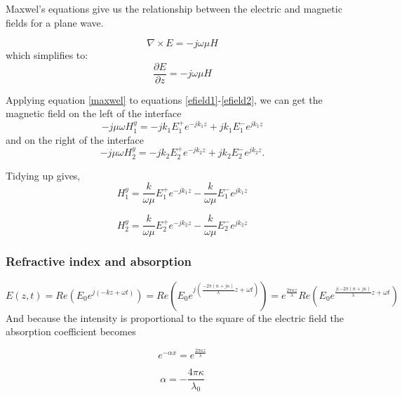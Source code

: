 \documentclass[11pt]{article}
\begin{document}
Maxwel's equations give us the relationship between the electric and magnetic fields for a plane wave.

\begin{equation}
\nabla \times E=-j\omega \mu H 
\end{equation}
which simplifies to:
\begin{equation}
\frac{\partial E} {\partial z}=-j\omega \mu H 
\label{maxwel}
\end{equation}

Applying equation \ref{maxwel} to equations \ref{efield1}-\ref{efield2}, we can get the magnetic field on the left of the interface
\begin{equation}
-j \mu \omega H^{y}_{1}=-j k_1 E^{+}_{1} e^{-j k_1 z}+j k_1 E^{-}_{1} e^{j k_1 z}
\end{equation}
and on the right of the interface
\begin{equation}
-j \mu \omega H^{y}_{2}=-j k_2 E^{+}_{2} e^{-j k_2 z}+j k_2 E^{-}_{2} e^{j k_2 z}.
\end{equation}

Tidying up gives,
\begin{equation}
H^{y}_{1}=\frac{k}{\omega \mu}E^{+}_{1} e^{-j k_1 z}-\frac{k}{\omega \mu} E^{-}_{1} e^{j k_1 z}
\end{equation}

\begin{equation}
H^{y}_{2}=\frac{k}{\omega \mu}E^{+}_{2} e^{-j k_2 z}-\frac{k}{\omega \mu} E^{-}_{2} e^{j k_2 z}
\end{equation}


\subsubsection{Refractive index and absorption}
\begin{equation}
E(z,t)=Re(E_0 e^{j(-kz+\omega t)})= Re(E_0 e^{j(\frac{-2 \pi (n+j\kappa)}{\lambda}z + \omega t)})=e^{\frac{2\pi\kappa z}{\lambda}}Re(E_0 e^{\frac{j(-2 \pi (n+j\kappa)}{\lambda}z +\omega t})
\end{equation}
And because the intensity is proportional to the square of the electric field the absorption coefficient becomes

\begin{equation}
e^{-\alpha x}=e^{\frac{2\pi\kappa z}{\lambda}}
\end{equation}

\begin{equation}
\alpha=-\frac{4\pi\kappa}{\lambda_0}
\end{equation}
\end{document}
